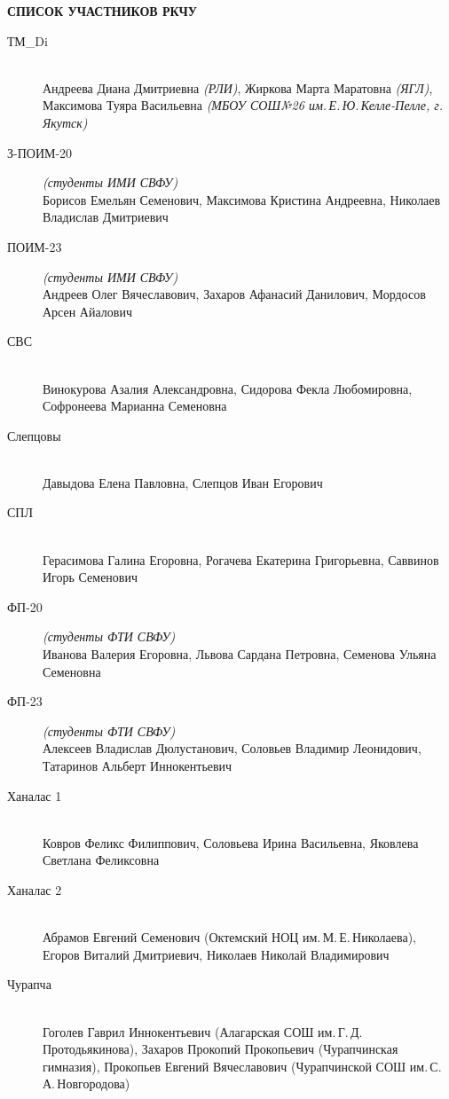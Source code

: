 \newpage
\noindent
\textbf{СПИСОК УЧАСТНИКОВ РКЧУ}
\begin{description}

\item[ТМ\_Di] \\
Андреева Диана Дмитриевна \textit{(РЛИ)},
Жиркова Марта Маратовна \textit{(ЯГЛ)},
Максимова Туяра Васильевна \textit{(МБОУ СОШ№26 им.\,Е.\,Ю.\,Келле-Пелле, г. Якутск)}

\item[З-ПОИМ-20] \textit{(студенты ИМИ СВФУ)} \\
Борисов Емельян Семенович, Максимова Кристина Андреевна, Николаев Владислав Дмитриевич

\item[ПОИМ-23] \textit{(студенты ИМИ СВФУ)} \\
Андреев Олег Вячеславович, Захаров Афанасий Данилович, Мордосов Арсен Айалович

\item[СВС] \\
Винокурова Азалия Александровна, Сидорова Фекла Любомировна, Софронеева Марианна Семеновна

\item[Слепцовы] \\
Давыдова Елена Павловна, Слепцов Иван Егорович

\item[СПЛ] \\
Герасимова Галина Егоровна, Рогачева Екатерина Григорьевна, Саввинов Игорь Семенович

\item[ФП-20] \textit{(студенты ФТИ СВФУ)} \\
Иванова Валерия Егоровна, Львова Сардана Петровна, Семенова Ульяна Семеновна

\item[ФП-23] \textit{(студенты ФТИ СВФУ)} \\
Алексеев Владислав Дюлустанович, Соловьев Владимир Леонидович, Татаринов Альберт Иннокентьевич

\item[Ханалас 1] \\
Ковров Феликс Филиппович,
Соловьева Ирина Васильевна,
Яковлева Светлана Феликсовна

\item[Ханалас 2] \\
Абрамов Евгений Семенович (Октемский НОЦ им.\,М.\,Е.\,Николаева),
Егоров Виталий Дмитриевич,
Николаев Николай Владимирович

\item[Чурапча] \\
Гоголев Гаврил Иннокентьевич (Алагарская СОШ им.\,Г.\,Д.\,Протодьякинова),
Захаров Прокопий Прокопьевич (Чурапчинская гимназия),
Прокопьев Евгений Вячеславович (Чурапчинской СОШ им.\,С.\,А.\,Новгородова)

\end{description}

